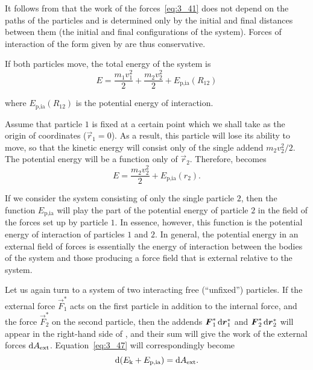 \noindent
It follows from  that the work of the forces~\eqref{eq:3_41} does not depend on the paths of the particles and is determined only by the initial and final distances between them (the initial and final configurations of the system). Forces of interaction of the form given by  are thus conservative.

If both particles move, the total energy of the system is
\begin{equation}\label{eq:3_49}
E = \frac{m_1v_1^2}{2} + \frac{m_2v_2^2}{2} + E_{\text{p,ia}}(R_{12})
\end{equation}

\noindent
where $E_{\text{p,ia}}(R_{12})$ is the potential energy of interaction.

Assume that particle $1$ is fixed at a certain point which we shall take as the origin of coordinates ($\vec{r}_1=0$). As a result, this particle will lose its ability to move, so that the kinetic energy will consist only of the single addend $m_2v_2^2/2$. The potential energy will be a function only of $\vec{r}_2$. Therefore,  becomes
\begin{equation}\label{eq:3_50}
E = \frac{m_2v_2^2}{2} + E_{\text{p,ia}}(r_2).
\end{equation}

\noindent
If we consider the system consisting of only the single particle $2$, then the function $E_{\text{p,ia}}$ will play the part of the potential energy of particle $2$ in the field of the forces set up by particle $1$. In essence, however, this function is the potential energy of interaction of particles $1$ and $2$. In general, the potential energy in an external field of forces is essentially the energy of interaction between the bodies of the system and those producing a force field that is external relative to the system.

Let us again turn to a system of two interacting free (``unfixed'') particles. If the external force $\vec{F}_1^*$ acts on the first particle in addition to the internal force, and the force $\vec{F}_2^*$ on the second particle, then the addends $\boldsymbol{F}_1^*\,\mathrm{d}\boldsymbol{r}_1^*$ and $\boldsymbol{F}_2^*\,\mathrm{d}\boldsymbol{r}_2^*$ will appear in the right-hand side of , and their sum will give the work of the external forces $\mathrm{d} A_{\text{ext}}$. Equation~\eqref{eq:3_47} will correspondingly become
\begin{equation}\label{eq:3_51}
\mathrm{d}(E_{\text{k}}+E_{\text{p,ia}}) = \mathrm{d} A_{\text{ext}}.
\end{equation}


